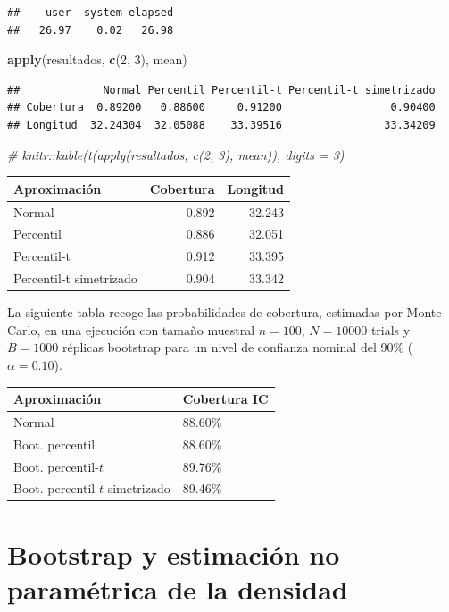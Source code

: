 \documentclass[]{book}
\newenvironment{Shaded}{\begin{snugshade}}{\end{snugshade}}
\newcommand{\KeywordTok}[1]{\textcolor[rgb]{0.13,0.29,0.53}{\textbf{#1}}}
\newcommand{\DecValTok}[1]{\textcolor[rgb]{0.00,0.00,0.81}{#1}}
\newcommand{\CommentTok}[1]{\textcolor[rgb]{0.56,0.35,0.01}{\textit{#1}}}
\newcommand{\NormalTok}[1]{#1}
\theoremstyle{definition}
\theoremstyle{definition}
\theoremstyle{definition}
\theoremstyle{remark}
\begin{document}
\begin{verbatim}
##    user  system elapsed 
##   26.97    0.02   26.98
\end{verbatim}

\begin{Shaded}
\begin{Highlighting}[]
\KeywordTok{apply}\NormalTok{(resultados, }\KeywordTok{c}\NormalTok{(}\DecValTok{2}\NormalTok{, }\DecValTok{3}\NormalTok{), mean)}
\end{Highlighting}
\end{Shaded}

\begin{verbatim}
##             Normal Percentil Percentil-t Percentil-t simetrizado
## Cobertura  0.89200   0.88600     0.91200                 0.90400
## Longitud  32.24304  32.05088    33.39516                33.34209
\end{verbatim}

\begin{Shaded}
\begin{Highlighting}[]
\CommentTok{# knitr::kable(t(apply(resultados, c(2, 3), mean)), digits = 3)}
\end{Highlighting}
\end{Shaded}

\begin{longtable}[]{@{}lrr@{}}
\toprule
Aproximación & Cobertura & Longitud\tabularnewline
\midrule
\endhead
Normal & 0.892 & 32.243\tabularnewline
Percentil & 0.886 & 32.051\tabularnewline
Percentil-t & 0.912 & 33.395\tabularnewline
Percentil-t simetrizado & 0.904 & 33.342\tabularnewline
\bottomrule
\end{longtable}

La siguiente tabla recoge las probabilidades de cobertura, estimadas por
Monte Carlo, en una ejecución con tamaño muestral \(n=100\), \(N=10000\)
trials y \(B=1000\) réplicas bootstrap para un nivel de confianza
nominal del 90\% (\(\alpha =0.10\)).

\begin{longtable}[]{@{}ll@{}}
\toprule
Aproximación & Cobertura IC\tabularnewline
\midrule
\endhead
Normal & 88.60\%\tabularnewline
Boot. percentil & 88.60\%\tabularnewline
Boot. percentil-\(t\) & 89.76\%\tabularnewline
Boot. percentil-\(t\) simetrizado & 89.46\%\tabularnewline
\bottomrule
\end{longtable}

\chapter{Bootstrap y estimación no paramétrica de la
densidad}\label{cap6}
\end{document}
